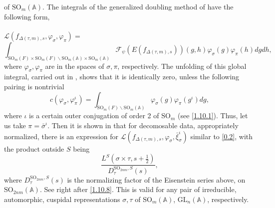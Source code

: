 \documentclass[12pts]{amsart}
\newcommand{\BA}{{\mathbb {A}}}
\newcommand{\GL}{{\mathrm{GL}}}
\newcommand{\SO}{{\mathrm{SO}}}
\begin{document}
of $\SO_m(\BA)$. The integrals of the generalized doubling method of \cite{CFGK17} have the following form,\\
\\
$\mathcal{L}(f_{\Delta(\tau,m),s},\varphi_\sigma, \varphi_\pi)=$
\begin{equation}\label{0.4}
\int_{\SO_m(F)\times \SO_m(F)\backslash
	\SO_m(\BA)\times \SO_m(\BA)}\mathcal{F}_\psi(E(f_{\Delta(\tau,
	m),s}))(g,h)\varphi_\sigma(g)\varphi_\pi(h)dgdh,
\end{equation}
where $\varphi_\sigma, \varphi_\pi $ are in the spaces of $\sigma, \pi$, respectively. 
The unfolding of this global integral, carried out in \cite{CFGK17}, shows that it is identically zero, unless the following pairing is nontrivial
$$
c(\varphi_\sigma,\varphi_\pi^\iota)=\int_{\SO_m(F)\backslash
	\SO_m(\BA)}\varphi_\sigma(g)\varphi_\pi(g^\iota)dg,
$$
where $\iota$ is a certain outer conjugation of order 2 of $\SO_m$ (see \eqref{1.10.1}). Thus, let us take $\pi=\bar{\sigma}^\iota$. Then it is shown in \cite{CFGK17} that for decomosable data, appropriately normalized, there is an expression for $\mathcal{L}(f_{\Delta(\tau,m),s},\varphi_\sigma, \bar{\xi}^\iota_\sigma)$  similar to \eqref{0.2}, with the product outside $S$ being
$$
\frac{L^S(\sigma\times \tau, s+\frac{1}{2})}{D^{\SO_{2nm},S}_\tau(s)},
$$
where $D^{\SO_{2nm},S}_\tau(s)$ is the normalizing factor of the Eisenstein series above, on $\SO_{2nm}(\BA)$. See right after \eqref{1.10.8}. This is valid for any pair of irreducible, automorphic, cuspidal representations $\sigma, \tau$ of $\SO_m(\BA)$, $\GL_n(\BA)$, respectively. 
\end{document}
